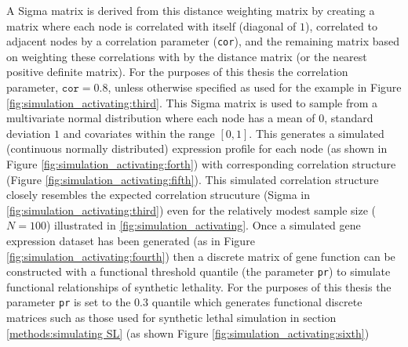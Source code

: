A Sigma matrix is derived from this distance weighting matrix by creating a matrix where each node is correlated with itself (diagonal of $1$), correlated to adjacent nodes by a correlation parameter (\texttt{cor}), and the remaining matrix based on weighting these correlations with by the distance matrix (or the nearest positive definite matrix). For the purposes of this thesis the correlation parameter, $\texttt{cor} = 0.8$, unless otherwise specified as used for the example in Figure \ref{fig:simulation_activating:third}. This Sigma matrix is used to sample from a multivariate normal distribution where each node has a mean of $0$, standard deviation $1$ and covariates within the range $[0,1]$. This generates a simulated (continuous normally distributed) expression profile for each node (as shown in Figure \ref{fig:simulation_activating:forth}) with corresponding correlation structure (Figure \ref{fig:simulation_activating:fifth}). This simulated correlation structure closely resembles the expected correlation strucuture (Sigma in \ref{fig:simulation_activating:third}) even for the relatively modest sample size ($N=100$) illustrated in \ref{fig:simulation_activating}. Once a simulated gene expression dataset has been generated (as in Figure \ref{fig:simulation_activating:fourth}) then a discrete matrix of gene function can be constructed with a functional threshold quantile (the parameter \texttt{pr}) to simulate functional relationships of synthetic lethality. For the purposes of this thesis the parameter \texttt{pr} is set to the 0.3 quantile which generates functional discrete matrices such as those used for synthetic lethal simulation in section \ref{methods:simulating SL} (as shown Figure \ref{fig:simulation_activating:sixth})

